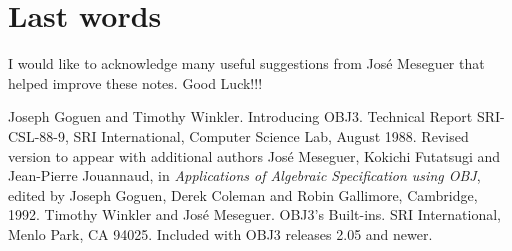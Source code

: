 \section{Last words}

I would like to acknowledge many useful suggestions from Jos\'{e}
Meseguer that helped improve these notes.  Good Luck!!!

%
\begin{thebibliography}{1}
  
 Joseph Goguen and Timothy Winkler.  \newblock
  Introducing {OBJ3}.  \newblock Technical Report SRI-CSL-88-9, SRI
  International, Computer Science Lab, August 1988.  \newblock Revised
  version to appear with additional authors Jos\'e Meseguer, Kokichi
  Futatsugi and Jean-Pierre Jouannaud, in {\em Applications of
    Algebraic Specification using {OBJ}}, edited by Joseph Goguen,
  Derek Coleman and Robin Gallimore, Cambridge, 1992.
 Timothy Winkler and Jos\'e Meseguer. \newblock
  {OBJ3}'s Built-ins. \newblock SRI International, Menlo Park, CA
  94025.  \newblock Included with OBJ3 releases 2.05 and newer.

\end{thebibliography}

\newpage
\tableofcontents


